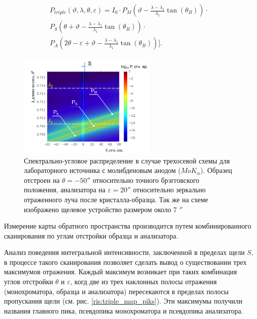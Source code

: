 \begin{eqnarray} \label{eq:triplr_spectra_angle_map}
  P_{triple}(\vartheta,\lambda,\theta,\varepsilon) =I_0\cdot
    P_M \left(\vartheta - \frac{\lambda - \lambda_1}{\lambda_1}\tan(\theta_B) \right) \cdot \nonumber \\
   P_S \left(\theta + \vartheta - \frac{\lambda - \lambda_1}{\lambda_1}\tan(\theta_B)\right)  \cdot  \nonumber \\
   P_A \left(2\theta - \varepsilon + \vartheta - \frac{\lambda - \lambda_1}{\lambda_1}\tan(\theta_B)\right) \Bigg].
 \end{eqnarray}

  \begin{figure}[H]
    \centering
    \includegraphics[width=0.6\textwidth]{images/triple_map.png}
    \caption{Спектрально-угловое распределение в случае трехосевой схемы
    для лабораторного источника с молибденовым анодом ($MoK_{\alpha}$).
    Образец отстроен на $\theta = - 50''$ относительно точного брэгговского положения,
    анализатора на $\varepsilon = 20''$ относительно
    зеркально отраженного луча после кристалла-образца. Так же на схеме изображено щелевое устройство размером около 7 $''$}
    \label{ris:triple_map}
  \end{figure}

Измерение карты обратного пространства производится путем комбинированного
сканирования по углам отстройки образца и анализатора.

Анализ поведения интегральной интенсивности, заключенной в пределах щели $S$,
в процессе такого сканирования позволяет сделать вывод о существовании трех
максимумов отражения. Каждый максимум возникает при таких комбинация углов отстройки
$\theta$ и $\varepsilon$, когд две из трех наклонных полосы отражения (монохроматора,
образца и анализатора) пересекаются в пределах полосы пропускания щели (см. рис. \ref{ris:triple_map_piks}).
Эти максимумы получили названия главного пика, псевдопика монохроматора и псевдопика анализатора.

